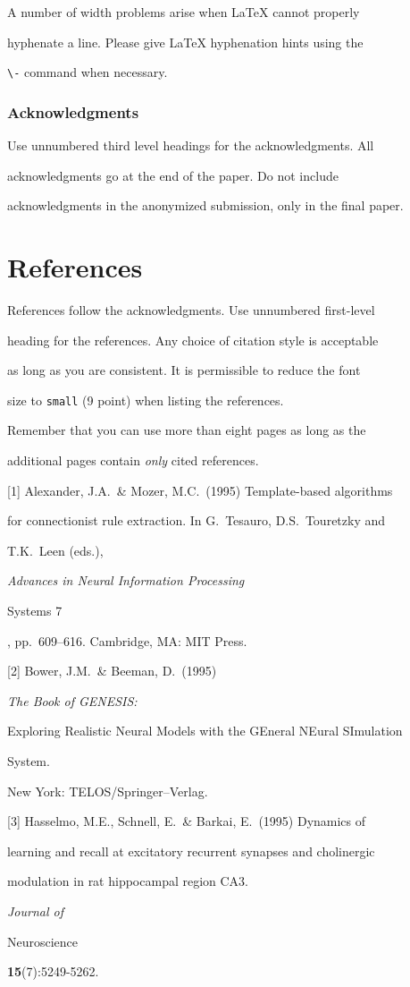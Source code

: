 \documentclass{article}
\begin{document}
A number of width problems arise when \LaTeX{} cannot properly

hyphenate a line. Please give LaTeX hyphenation hints using the

\verb+\-+ command when necessary.



\subsubsection*{Acknowledgments}



Use unnumbered third level headings for the acknowledgments. All

acknowledgments go at the end of the paper. Do not include

acknowledgments in the anonymized submission, only in the final paper.



\section*{References}



References follow the acknowledgments. Use unnumbered first-level

heading for the references. Any choice of citation style is acceptable

as long as you are consistent. It is permissible to reduce the font

size to \verb+small+ (9 point) when listing the references. {\bf

  Remember that you can use more than eight pages as long as the

  additional pages contain \emph{only} cited references.}

\medskip



\small



[1] Alexander, J.A.\ \& Mozer, M.C.\ (1995) Template-based algorithms

for connectionist rule extraction. In G.\ Tesauro, D.S.\ Touretzky and

T.K.\ Leen (eds.), {\it Advances in Neural Information Processing

  Systems 7}, pp.\ 609--616. Cambridge, MA: MIT Press.



[2] Bower, J.M.\ \& Beeman, D.\ (1995) {\it The Book of GENESIS:

  Exploring Realistic Neural Models with the GEneral NEural SImulation

  System.}  New York: TELOS/Springer--Verlag.



[3] Hasselmo, M.E., Schnell, E.\ \& Barkai, E.\ (1995) Dynamics of

learning and recall at excitatory recurrent synapses and cholinergic

modulation in rat hippocampal region CA3. {\it Journal of

  Neuroscience} {\bf 15}(7):5249-5262.
\end{document}
